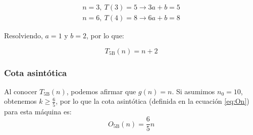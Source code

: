 \begin{subequations}
    \begin{gather}
        n = 3,\ T(3) = 5 \rightarrow 3a + b = 5 \\
        n = 6,\ T(4) = 8 \rightarrow 6a + b = 8
    \end{gather}
\end{subequations}

Resolviendo, $a=1$ y $b=2$, por lo que:

\begin{equation}
    T_{\mathrm{5B}}(n) = n + 2
\end{equation}


\subsubsection*{Cota asintótica}
Al conocer $T_{\mathrm{5B}}(n)$, podemos afirmar que $g(n) = n$. Si asumimos $n_0 = 10$, obtenemos $k \geq \frac{6}{5}$, por lo que la cota asintótica (definida en la ecuación \ref{eq:On}) para esta máquina es:
\begin{equation}
    O_{\mathrm{5B}}(n) = \frac{6}{5} n
\end{equation}

